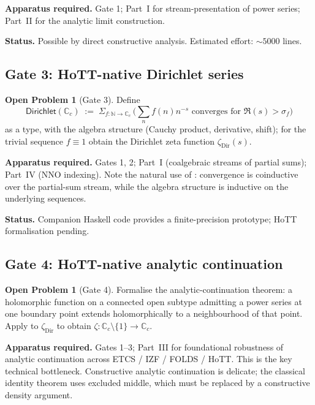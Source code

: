 \documentclass[12pt]{article}
\theoremstyle{definition}
\newtheorem{problem}[theorem]{Open Problem}
\theoremstyle{remark}
\newcommand{\N}{\mathbb{N}}
\newcommand{\C}{\mathbb{C}}
\newcommand{\Cc}{\C_{c}}
\begin{document}
\textbf{Apparatus required.} Gate 1; Part~I for stream-presentation of
power series; Part~II for the analytic limit construction.

\textbf{Status.} Possible by direct constructive analysis. Estimated
effort: $\sim 5000$ lines.

\subsection{Gate 3: HoTT-native Dirichlet series}

\begin{problem}[Gate 3]\label{prob:gate3}
Define
\[
\mathsf{Dirichlet}(\Cc)
\;:=\; \Sigma_{f : \N \to \Cc}\,
  \bigl(\textstyle\sum_n f(n) n^{-s}\text{ converges for } \Re(s) > \sigma_f\bigr)
\]
as a type, with the algebra structure (Cauchy product, derivative,
shift); for the trivial sequence $f \equiv 1$ obtain the Dirichlet zeta
function $\zeta_{\mathrm{Dir}}(s)$.
\end{problem}

\textbf{Apparatus required.} Gates 1, 2; Part~I (coalgebraic streams of
partial sums); Part~IV (NNO indexing). Note the natural use of
: convergence is coinductive over the partial-sum
stream, while the algebra structure is inductive on the underlying
sequences.

\textbf{Status.} Companion Haskell code provides a finite-precision
prototype; HoTT formalisation pending.

\subsection{Gate 4: HoTT-native analytic continuation}

\begin{problem}[Gate 4]\label{prob:gate4}
Formalise the analytic-continuation theorem: a holomorphic function on a
connected open subtype admitting a power series at one boundary point
extends holomorphically to a neighbourhood of that point. Apply to
$\zeta_{\mathrm{Dir}}$ to obtain $\zeta : \Cc \setminus \{1\} \to \Cc$.
\end{problem}

\textbf{Apparatus required.} Gates 1--3; Part~III for foundational
robustness of analytic continuation across ETCS / IZF / FOLDS / HoTT\@.
This is the key technical bottleneck. Constructive analytic continuation
is delicate; the classical identity theorem uses excluded middle, which
must be replaced by a constructive density argument.
\end{document}
